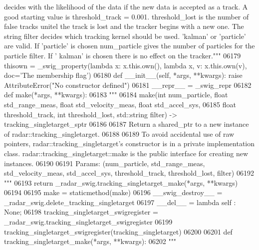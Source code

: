 \begin{DoxyCode}
{{{{{{{{{{{{{{{{{{{{{{       decides with the likelihood of the data if the new data is accepted as a track. A good starting value is
       threshold\_track = 0.001. threshold\_lost is the number of false tracks unitel the track is lost and the tracker
       begins with a new one. The string filter decides which tracking kernel should be used. 'kalman' or 'particle'
       are valid. If 'particle' is chosen num\_particle gives the number of particles for the particle filter. If '
      kalman' is chosen there is no effect on the tracker."""}
06179     thisown = _swig_property(\textcolor{keyword}{lambda} x: x.this.own(), \textcolor{keyword}{lambda} x, v: x.this.own(v), doc=\textcolor{stringliteral}{'The membership flag'})
06180     \textcolor{keyword}{def }__init__(self, *args, **kwargs): \textcolor{keywordflow}{raise} AttributeError(\textcolor{stringliteral}{"No constructor defined"})
06181     \_\_repr\_\_ = \_swig\_repr
06182     \textcolor{keyword}{def }make(*args, **kwargs):
06183         \textcolor{stringliteral}{"""}
06184 \textcolor{stringliteral}{        make(int num\_particle, float std\_range\_meas, float std\_velocity\_meas, float std\_accel\_sys, }
06185 \textcolor{stringliteral}{            float threshold\_track, int threshold\_lost, std::string filter) -> tracking\_singletarget\_sptr}
06186 \textcolor{stringliteral}{}
06187 \textcolor{stringliteral}{        Return a shared\_ptr to a new instance of radar::tracking\_singletarget.}
06188 \textcolor{stringliteral}{}
06189 \textcolor{stringliteral}{        To avoid accidental use of raw pointers, radar::tracking\_singletarget's constructor is in a private
       implementation class. radar::tracking\_singletarget::make is the public interface for creating new
       instances.}
06190 \textcolor{stringliteral}{}
06191 \textcolor{stringliteral}{        Params: (num\_particle, std\_range\_meas, std\_velocity\_meas, std\_accel\_sys, threshold\_track,
       threshold\_lost, filter)}
06192 \textcolor{stringliteral}{        """}
06193         \textcolor{keywordflow}{return} \_radar\_swig.tracking\_singletarget\_make(*args, **kwargs)
06194 
06195     make = staticmethod(make)
06196     \_\_swig\_destroy\_\_ = \_radar\_swig.delete\_tracking\_singletarget
06197     \_\_del\_\_ = \textcolor{keyword}{lambda} self : \textcolor{keywordtype}{None};
06198 tracking\_singletarget\_swigregister = \_radar\_swig.tracking\_singletarget\_swigregister
06199 tracking_singletarget_swigregister(tracking\_singletarget)
06200 
06201 \textcolor{keyword}{def }tracking_singletarget_make(*args, **kwargs):
06202   \textcolor{stringliteral}{"""}
}}}}}}}}}}}}}}}}}}}}}
\end{DoxyCode}
